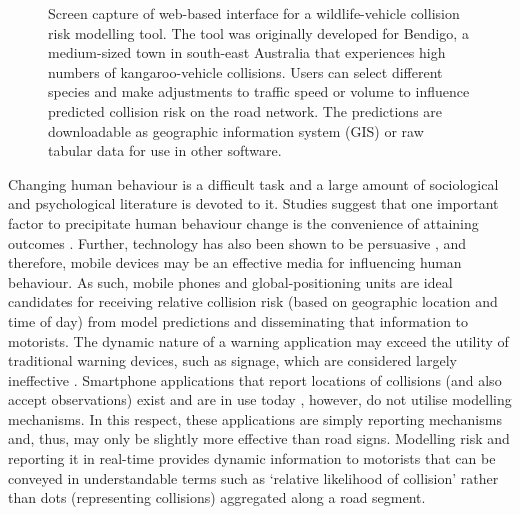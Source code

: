 \begin{figure*}[!h]
  \vspace{0.5cm}  
  \centering
  \caption[Decision support tool for wildlife-vehicle collisions]{Screen capture of web-based interface for a wildlife-vehicle collision risk modelling tool. The tool was originally developed for Bendigo, a medium-sized town in south-east Australia that experiences high numbers of kangaroo-vehicle collisions. Users can select different species and make adjustments to traffic speed or volume to influence predicted collision risk on the road network. The predictions are downloadable as geographic information system (GIS) or raw tabular data for use in other software.}
  \label{wvc_tool}
  \vspace{0.5cm} 
\end{figure*}

Changing human behaviour is a difficult task and a large amount of sociological and psychological literature is devoted to it. Studies suggest that one important factor to precipitate human behaviour change is the convenience of attaining outcomes \citep[i.e. least effort hypothesis proposed in human ecology, see][]{zipf49}. Further, technology has also been shown to be persuasive \citep{fogg03,lath13}, and therefore, mobile devices may be an effective media for influencing human behaviour. As such, mobile phones and global-positioning units are ideal candidates for receiving relative collision risk (based on geographic location and time of day) from model predictions and disseminating that information to motorists. The dynamic nature of a warning application may exceed the utility of traditional warning devices, such as signage, which are considered largely ineffective \citep{bond13}.  Smartphone applications that report locations of collisions (and also accept observations) exist and are in use today \citep{aane09}, however, do not utilise modelling mechanisms. In this respect, these applications are simply reporting mechanisms and, thus, may only be slightly more effective than road signs. Modelling risk and reporting it in real-time provides dynamic information to motorists that can be conveyed in understandable terms such as `relative likelihood of collision' rather than dots (representing collisions) aggregated along a road segment.

